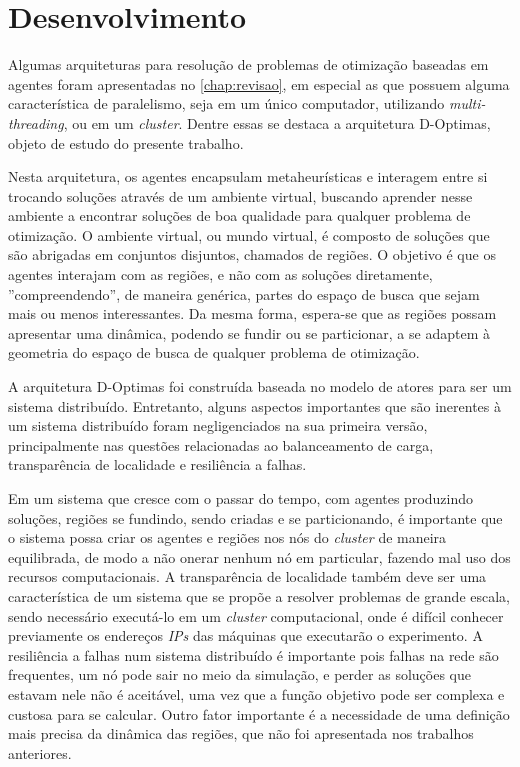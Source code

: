 

\chapter{Desenvolvimento}
\label{chap:desenvolvimento}

Algumas arquiteturas para resolução de problemas de otimização baseadas em agentes foram apresentadas no \autoref{chap:revisao}, em especial as que possuem alguma característica de paralelismo, seja em um único computador, utilizando \textit{multi-threading}, ou em um \textit{cluster}. Dentre essas se destaca a arquitetura D-Optimas, objeto de estudo do presente trabalho. 

Nesta arquitetura, os agentes encapsulam metaheurísticas e interagem entre si trocando soluções através de um ambiente virtual, buscando aprender nesse ambiente a encontrar soluções de boa qualidade para qualquer problema de otimização. O ambiente virtual, ou mundo virtual, é composto de soluções que são abrigadas em conjuntos disjuntos, chamados de regiões. O objetivo é que os agentes interajam com as regiões, e não com as soluções diretamente, ''compreendendo'', de maneira genérica, partes do espaço de busca que sejam mais ou menos interessantes. Da mesma forma, espera-se que as regiões possam apresentar uma dinâmica, podendo se fundir ou se particionar, a se adaptem à geometria do espaço de busca de qualquer problema de otimização.   

A arquitetura D-Optimas foi construída baseada no modelo de atores para ser um sistema distribuído. Entretanto, alguns aspectos importantes que são inerentes à um sistema distribuído foram negligenciados na sua primeira versão, principalmente nas questões relacionadas ao balanceamento de carga, transparência de localidade e resiliência a falhas.

Em um sistema que cresce com o passar do tempo, com agentes produzindo soluções, regiões se fundindo, sendo criadas e se particionando, é importante que o sistema possa criar os agentes e regiões nos nós do \textit{cluster} de maneira equilibrada, de modo a não onerar nenhum nó em particular, fazendo mal uso dos recursos computacionais. A transparência de localidade também deve ser uma característica de um sistema que se propõe a resolver problemas de grande escala, sendo necessário executá-lo em um \textit{cluster} computacional, onde é difícil conhecer previamente os endereços \textit{IPs} das máquinas que executarão o experimento. A resiliência a falhas num sistema distribuído é importante pois falhas na rede são frequentes, um nó pode sair no meio da simulação, e perder as soluções que estavam nele não é aceitável, uma vez que a função objetivo pode ser complexa e custosa para se calcular.
Outro fator importante é a necessidade de uma definição mais precisa da dinâmica das regiões,  que não foi apresentada nos trabalhos anteriores.

